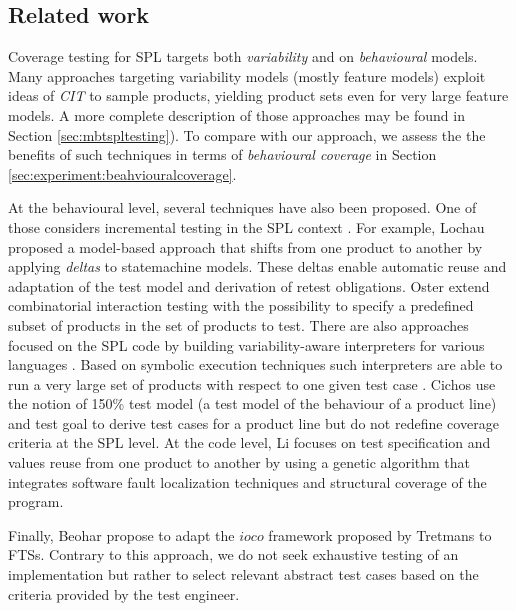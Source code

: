 \subsection{Related work}

Coverage testing for SPL targets both \emph{variability} and on \emph{behavioural} models.   
%
Many approaches targeting variability models (mostly feature models) exploit ideas of \emph{\gls{CIT}} to sample products, yielding product sets even for very large feature models. A more complete description of those approaches may be found in Section \ref{sec:mbtspltesting}). To compare with our approach, we assess the the benefits of such techniques in terms of \emph{behavioural coverage} in Section \ref{sec:experiment:beahviouralcoverage}.         

At the behavioural level, several techniques have also been proposed. One of those considers incremental testing in the SPL context \cite{Uzuncaova2010,Oster2010,Lochau2012,Knapp2014}.  For example, Lochau \etal \cite{Lochau2012,Lochau2014} proposed a model-based approach that  shifts from one product to another  by applying \textit{deltas} to statemachine models. These deltas enable automatic reuse and adaptation of the test model and derivation of retest obligations. Oster \etal \cite{Oster2010} extend combinatorial interaction testing with the possibility to specify a predefined subset of products in the set of products to test. There are also approaches focused on the SPL code by building variability-aware interpreters for various languages \cite{Kastner2012}. Based on symbolic execution techniques such interpreters are able to run a very large set of products with respect to one given test case \cite{Nguyen2014}. Cichos \etal \cite{Cichos2011} use the notion of 150\% test model (\ie a test model of the behaviour of a product line) and test goal to derive test cases for a product line but do not redefine coverage criteria at the SPL level. At the code level, Li \etal \cite{Li2017} focuses on test specification and values reuse from one product to another by using a genetic algorithm that integrates  software fault localization techniques and structural coverage of the program.

Finally, Beohar \etal \cite{Beohar2014a,Beohar2014,Beohar2015} propose to adapt the $ioco$ framework proposed by Tretmans \cite{Tretmans2008} to FTSs. Contrary to this approach, we do not seek exhaustive testing of an implementation but rather to select relevant abstract test cases based on the criteria provided by the test engineer.


